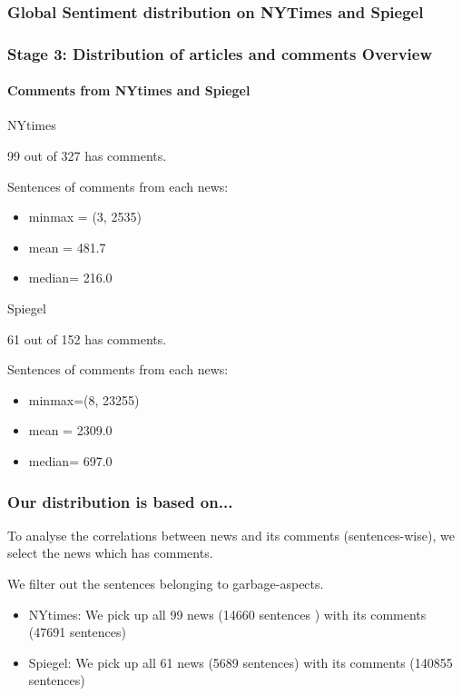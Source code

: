\documentclass{tum-presentation}
\begin{document}
\subsubsection{Global Sentiment distribution on NYTimes and Spiegel }%
\begin{frame}
  \frametitle{Stage 3: Distribution of articles and comments Overview }
  \framesubtitle{Comments from NYtimes and Spiegel }
  \begin{description}
 \large
 \item NYtimes
    \item 99 out of 327 has comments.
    \item Sentences of comments from each news:
    \item \begin{itemize}
      \item minmax = (3, 2535)
      \item mean = 481.7
      \item median= 216.0
    \end{itemize}
  \end{description}
  \vspace{0.7cm}
  \begin{description}
    \large
    \item Spiegel
       \item 61 out of 152 has comments.
       \item Sentences of comments from each news:
       \item \begin{itemize}
         \item minmax=(8, 23255)
         \item mean = 2309.0
         \item median= 697.0
       \end{itemize}
     \end{description}
\end{frame}

\begin{frame}
  \frametitle{Our distribution is based on...}
  \begin{description}
 \large
    \item To analyse the correlations between news and its comments (sentences-wise), we select the news which has comments.
    \item We filter out the sentences belonging to garbage-aspects.
    \item \begin{itemize}
    \item NYtimes: We pick up all 99 news  (14660 sentences ) with its comments (47691 sentences)
    \item Spiegel: We pick up all 61 news (5689 sentences) with its comments (140855 sentences)
  \end{itemize}
  \end{description}
\end{frame}
\end{document}
